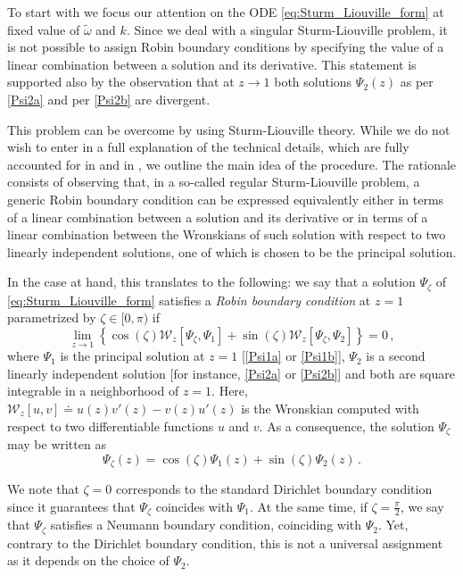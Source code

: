 \documentclass[aps, prd, amsmath, floats, floatfix, twocolumn, nofootinbib, superscriptaddress, showpacs]{revtex4-1}
\def\tomega{{\tilde{\omega}}}
\begin{document}
To start with we focus our attention on the ODE \eqref{eq:Sturm_Liouville_form} at fixed value of $\tomega$ and $k$. Since we deal with a singular Sturm-Liouville problem, it is not possible to assign Robin boundary conditions by specifying the value of a linear combination between a solution and its derivative. This statement is supported also by the observation that at $z\to 1$ both solutions $\Psi_2(z)$ as per \eqref{Psi2a} and per \eqref{Psi2b} are divergent.
	
This problem can be overcome by using Sturm-Liouville theory. While we do not wish to enter in a full explanation of the technical details, which are fully accounted for in \cite{Dappiaggi:2016fwc} and in \cite{Zettl:2005}, we outline the main idea of the procedure. The rationale consists of observing that, in a so-called regular Sturm-Liouville problem, a generic Robin boundary condition can be expressed equivalently either in terms of a linear combination between a solution and its derivative or in terms of a linear combination between the Wronskians of such solution with respect to two linearly independent solutions, one of which is chosen to be the principal solution.
	
In the case at hand, this translates to the following: we say that a solution $\Psi_{\zeta}$ of \eqref{eq:Sturm_Liouville_form} satisfies a {\em Robin boundary condition} at $z=1$ parametrized by $\zeta \in [0,\pi)$ if
%
\begin{equation} \label{eq:RBC}
\lim_{z \to 1} \left\{ \cos(\zeta) \mathcal{W}_z[\Psi_{\zeta}, \Psi_1] + \sin(\zeta) \mathcal{W}_z[\Psi_{\zeta}, \Psi_2] \right\} = 0 \, ,
\end{equation}
%
where $\Psi_1$ is the principal solution at $z=1$ [\eqref{Psi1a} or \eqref{Psi1b}], $\Psi_2$ is a second linearly independent solution [for instance, \eqref{Psi2a} or \eqref{Psi2b}] and both are square integrable in a neighborhood of $z=1$. Here, $\mathcal{W}_z[u,v] \doteq u(z)v'(z) - v(z)u'(z)$ is the Wronskian computed with respect to two differentiable functions $u$ and $v$. As a consequence, the solution $\Psi_{\zeta}$ may be written as
%
\begin{equation}\label{eq:Robin_solution}
\Psi_{\zeta}(z) = \cos(\zeta)\Psi_1(z)+\sin(\zeta)\Psi_2(z) \, .
\end{equation}
%
	
We note that $\zeta=0$ corresponds to the standard Dirichlet boundary condition since it guarantees that $\Psi_{\zeta}$ coincides with $\Psi_1$. At the same time, if $\zeta=\frac{\pi}{2}$, we say that $\Psi_{\zeta}$ satisfies a Neumann boundary condition, coinciding with $\Psi_2$. Yet, contrary to the Dirichlet boundary condition, this is not a universal assignment as it depends on the choice of $\Psi_2$. 
\end{document}
